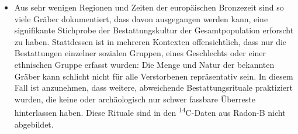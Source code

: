 \documentclass[openany,twoside,twocolumn]{book}
\begin{document}
\begin{itemize}
\item
  Aus sehr wenigen Regionen und Zeiten der europäischen Bronzezeit sind so viele Gräber dokumentiert, dass davon ausgegangen werden kann, eine signifikante Stichprobe der Bestattungskultur der Gesamtpopulation erforscht zu haben. Stattdessen ist in mehreren Kontexten offensichtlich, dass nur die Bestattungen einzelner sozialen Gruppen, eines Geschlechts oder einer ethnischen Gruppe erfasst wurden: Die Menge und Natur der bekannten Gräber kann schlicht nicht für alle Verstorbenen repräsentativ sein. In diesem Fall ist anzunehmen, dass weitere, abweichende Bestattungsrituale praktiziert wurden, die keine oder archäologisch nur schwer fassbare Überreste hinterlassen haben. Diese Rituale sind in den \textsuperscript{14}C-Daten aus Radon-B nicht abgebildet.
\end{itemize}
\end{document}
